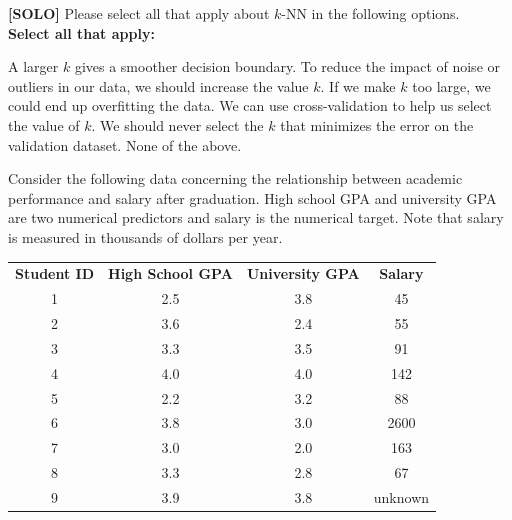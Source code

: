 \documentclass[11pt,addpoints,answers]{exam}
\begin{document}
\begin{questions}
    

    \question[3] \textbf{[SOLO]} Please select all that apply about $k$-NN in the following options. \\ \textbf{Select all that apply:}
    {
    \checkboxchar{$\Box$} \checkedchar{$\blacksquare$}
    \begin{checkboxes}
        \CorrectChoice A larger $k$ gives a smoother decision boundary.
        \CorrectChoice To reduce the impact of noise or outliers in our data, we should increase the value $k$.
        \choice If we make $k$ too large, we could end up overfitting the data.
        \CorrectChoice We can use cross-validation to help us select the value of $k$.
        \choice We should never select the $k$ that minimizes the error on the validation dataset.
        \choice None of the above.
    \end{checkboxes}
    }

    
    
    \newpage
    
    \question[8] Consider the following data concerning the relationship between academic performance and salary after graduation. High school GPA and university GPA are two numerical predictors and salary is the numerical target. Note that salary is measured in thousands of dollars per year.
    
    \begin{table}[H]
        \centering
        \begin{tabular}{cccc}
            \textbf{Student ID} & \textbf{High School GPA} & \textbf{University GPA} & \textbf{Salary} \\
            1 & 2.5 & 3.8 & 45 \\
            2 & 3.6 & 2.4 & 55 \\
            3 & 3.3 & 3.5 & 91 \\
            4 & 4.0 & 4.0 & 142 \\
            5 & 2.2 & 3.2 & 88 \\
            6 & 3.8 & 3.0 & 2600 \\
            7 & 3.0 & 2.0 & 163 \\
            8 & 3.3 & 2.8 & 67 \\
            9 & 3.9 & 3.8 & unknown \\
        \end{tabular}
        \label{tab:my_label}
    \end{table}
    
    \begin{parts}

\end{parts}
\end{questions}
\end{document}
